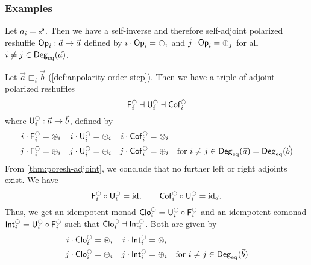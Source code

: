 \documentclass[a4paper]{memoir}
\begin{document}
\subsubsection{Examples}
\begin{example} \label{ex:poresh-op}
	Let $a_i = \ypolar$.
	Then we have a self-inverse and therefore self-adjoint polarized reshuffle ${\mathsf{Op}}_i : \vec a \to \vec a$ defined by $i \cdot {\mathsf{Op}}_i = {\ominus}_i$ and $j \cdot {\mathsf{Op}}_i = {\oplus}_j$ for all $i \neq j \in {\mathsf{Deg}_{\mathrm{eq}}}(\vec a)$.
\end{example}
\begin{example} \label{ex:poresh-sym}
	Let $\vec a \sqsubset_i \vec b$ (\cref{def:anpolarity-order-step}).
	Then we have a triple of adjoint polarized reshuffles
	\[
		\Fsymresh_i \dashv \Usymresh_i \dashv \Csymresh_i
	\]
	where $\Usymresh_i : \vec a \to \vec b$, defined by
	\begin{align*}
		i \cdot \Fsymresh_i &= \isopol_i
		& i \cdot \Usymresh_i &= \nonpol_i
		& i \cdot \Csymresh_i &= \mixpol_i
		\\
		j \cdot \Fsymresh_i &= \pospol_i
		& j \cdot \Usymresh_i &= \pospol_i
		& j \cdot \Csymresh_i &= \pospol_i
		& \text{for $i \neq j \in \Degeq(\vec a) = \Degeq(\vec b)$}
	\end{align*}
	From \cref{thm:poresh-adjoint}, we conclude that no further left or right adjoints exist. We have
	\[
		\Fsymresh_i \circ \Usymresh_i = \id, \qquad \Csymresh_i \circ \Usymresh_i = \id_{\vec a}.
	\]
	Thus, we get an idempotent monad $\UFsymresh_i = \Usymresh_i \circ \Fsymresh_i$ and an idempotent comonad $\UCsymresh_i = \Usymresh_i \circ \Fsymresh_i$ such that $\UFsymresh_i \dashv \UCsymresh_i$.
	Both are given by
	\begin{align*}
		i \cdot \UFsymresh_i &= \isopol_i
		& i \cdot \UCsymresh_i &= \mixpol_i
		\\
		j \cdot \UFsymresh_i &= \pospol_i
		& j \cdot \UCsymresh_i &= \pospol_i
		& \text{for $i \neq j \in \Degeq(\vec b)$}
	\end{align*}
\end{example}
\end{document}
